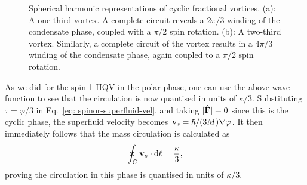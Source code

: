 \begin{figure}
    \centering
    \caption[Spherical harmonic representation of cyclic fractional vortices]
    {\label{fig: cyclic-fractional-spherical}Spherical harmonic
        representations of cyclic fractional vortices.
        (a): A one-third vortex. A complete circuit reveals a \(2\pi/3\)
        winding of the condensate phase, coupled with a \(\pi/2\) spin rotation.
        (b): A two-third vortex. Similarly, a complete circuit of the
        vortex results in a \(4\pi/3\) winding of the condensate phase, again
        coupled to a \(\pi/2\) spin rotation.}
\end{figure}
As we did for the spin-1 HQV in the polar phase, one can use the above wave
function to see that the circulation is now quantised in units of
\(\kappa / 3\).
Substituting \(\tau=\varphi/3\) in Eq.~\eqref{eq: spinor-superfluid-vel}, and
taking \(|\hat{\vb{F}}|=0\) since this is the cyclic phase, the superfluid
velocity becomes \(\vb{v}_s=\hbar/(3M)\nabla\varphi \).
It then immediately follows that the mass circulation is calculated as
\begin{align}
    \oint_C \vb{v}_s \cdot \dd \vb{\ell} = \frac{\kappa}{3},
\end{align}
proving the circulation in this phase is quantised in units of \(\kappa / 3\).